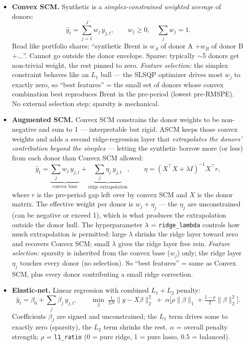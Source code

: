 \documentclass[11pt,a4paper]{article}
\begin{document}
\begin{itemize}
  \item \textbf{Convex SCM.} Synthetic is a \emph{simplex-constrained weighted average} of donors:
    \[
      \hat{y}_t = \sum_{j=1}^{J} w_j\, y_{j,t}, \qquad w_j \geq 0, \quad \sum_j w_j = 1.
    \]
    Read like portfolio shares: ``synthetic Brent is $w_A$ of donor A $+ w_B$ of donor B $+ \dots$''. Cannot go outside the donor envelope. Sparse: typically $\sim$5 donors get non-trivial weight, the rest pinned to zero.
    \emph{Feature selection:} the simplex constraint behaves like an $L_1$ ball --- the SLSQP optimizer drives most $w_j$ to exactly zero, so ``best features'' = the small set of donors whose convex combination best reproduces Brent in the pre-period (lowest pre-RMSPE). No external selection step; sparsity is mechanical.
  \item \textbf{Augmented SCM.} Convex SCM constrains the donor weights to be non-negative and sum to 1 --- interpretable but rigid. ASCM keeps those convex weights and adds a second ridge-regression layer that \emph{extrapolates the donors' contribution beyond the simplex} --- letting the synthetic borrow more (or less) from each donor than Convex SCM allowed:
    \[
      \hat{y}_t = \underbrace{\sum_j w_j\, y_{j,t}}_{\text{convex base}} + \underbrace{\sum_j \eta_j\, y_{j,t}}_{\text{ridge extrapolation}}, \qquad \eta = (X^\top X + \lambda I)^{-1} X^\top r,
    \]
    where $r$ is the pre-period gap left over by convex SCM and $X$ is the donor matrix. The effective weight per donor is $w_j + \eta_j$ --- the $\eta_j$ are unconstrained (can be negative or exceed 1), which is what produces the extrapolation outside the donor hull. The hyperparameter $\lambda$ = \texttt{ridge\_lambda} controls how much extrapolation is permitted: large $\lambda$ shrinks the ridge layer toward zero and recovers Convex SCM; small $\lambda$ gives the ridge layer free rein.
    \emph{Feature selection:} sparsity is inherited from the convex base ($w_j$) only; the ridge layer $\eta_j$ touches every donor (no selection). So ``best features'' = same as Convex SCM, plus every donor contributing a small ridge correction.
  \item \textbf{Elastic-net.} Linear regression with combined $L_1 + L_2$ penalty:
    \[
      \hat{y}_t = \beta_0 + \sum_j \beta_j\, y_{j,t}, \qquad
      \min_\beta \;\tfrac{1}{2N}\|y - X\beta\|_2^2 \;+\; \alpha \Big[\rho \|\beta\|_1 + \tfrac{1-\rho}{2}\|\beta\|_2^2\Big].
    \]
    Coefficients $\beta_j$ are signed and unconstrained; the $L_1$ term drives some to exactly zero (sparsity), the $L_2$ term shrinks the rest. $\alpha$ = overall penalty strength; $\rho$ = \texttt{l1\_ratio} (0 = pure ridge, 1 = pure lasso, 0.5 = balanced).

\end{itemize}
\end{document}
